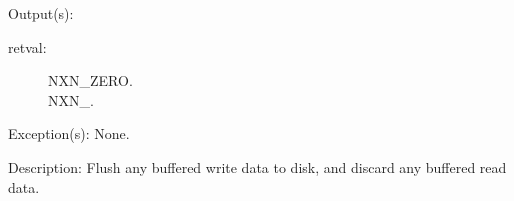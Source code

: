 \begin{capi}
\begin{capilist}
	\item[Output(s): ]
		\begin{description}\item[]
		\item[retval: ]
			\begin{description}\item[]
			\item[NXN\_ZERO.]
			\item[NXN\_.]
			\end{description}
		\end{description}
	\item[Exception(s): ] None.
	\item[Description: ]
		Flush any buffered write data to disk, and discard any buffered
		read data.
	\end{capilist}
\end{capi}
